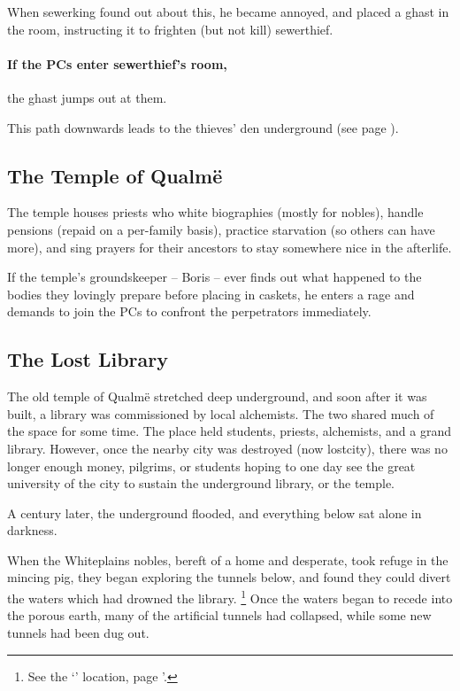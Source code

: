 \begin{multicols}{2}
When \gls{sewerking} found out about this, he became annoyed, and placed a ghast in the room, instructing it to frighten (but not kill) \gls{sewerthief}.

\paragraph{If the PCs enter \gls{sewerthief}'s room,}
the ghast jumps out at them.

\ghast

This path downwards leads to the thieves' den underground (see page \pageref{pigexit}).

\subsection{The Temple of Qualm\"e}

The temple houses priests who white biographies (mostly for nobles), handle pensions (repaid on a per-family basis), practice starvation (so others can have more), and sing prayers for their ancestors to stay somewhere nice in the afterlife.

If the temple's groundskeeper -- Boris -- ever finds out what happened to the bodies they lovingly prepare before placing in caskets, he enters a rage and demands to join the PCs to confront the perpetrators immediately.


\subsection{The Lost Library}\label{sewers}\setcounter{list}{0}

The old temple of Qualm\"{e} stretched deep underground, and soon after it was built, a library was commissioned by local alchemists.
The two shared much of the space for some time.
The place held students, priests, alchemists, and a grand library.
However, once the nearby city was destroyed (now \gls{lostcity}), there was no longer enough money, pilgrims, or students hoping to one day see the great university of the city to sustain the underground library, or the temple.

A century later, the underground flooded, and everything below sat alone in darkness.

When the Whiteplains nobles, bereft of a home and desperate, took refuge in the mincing pig, they began exploring the tunnels below, and found they could divert the waters which had drowned the library.%
\footnote{See the `' location, page \pageref{runoff}'.}
Once the waters began to recede into the porous earth, many of the artificial tunnels had collapsed, while some new tunnels had been dug out.


\end{multicols}
